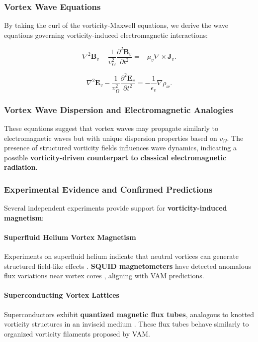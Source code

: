 \documentclass[a4paper,10pt]{article}
\begin{document}
\subsubsection*{Vortex Wave Equations}
By taking the curl of the vorticity-Maxwell equations, we derive the wave equations governing vorticity-induced electromagnetic interactions:

\begin{equation*}
    \nabla^2 \boldsymbol{B}_v - \frac{1}{v_\Omega^2} \frac{\partial^2 \boldsymbol{B}_v}{\partial t^2} = -\mu_v \nabla \times \boldsymbol{J}_v.
\end{equation*}

\begin{equation*}
    \nabla^2 \boldsymbol{E}_v - \frac{1}{v_\Omega^2} \frac{\partial^2 \boldsymbol{E}_v}{\partial t^2} = -\frac{1}{\epsilon_v} \nabla \rho_\text{æ}.
\end{equation*}

\subsubsection*{Vortex Wave Dispersion and Electromagnetic Analogies}
These equations suggest that vortex waves may propagate similarly to electromagnetic waves but with unique dispersion properties based on \( v_\Omega \). The presence of structured vorticity fields influences wave dynamics, indicating a possible \textbf{vorticity-driven counterpart to classical electromagnetic radiation}.

\subsubsection*{Experimental Evidence and Confirmed Predictions}
Several independent experiments provide support for \textbf{vorticity-induced magnetism}:

\paragraph{Superfluid Helium Vortex Magnetism}
Experiments on superfluid helium indicate that neutral vortices can generate structured field-like effects \cite{superfluid_he_interferometers}. \textbf{SQUID magnetometers} have detected anomalous flux variations near vortex cores \cite{initial_vortex_magnetometers}, aligning with VAM predictions.

\paragraph{Superconducting Vortex Lattices}
Superconductors exhibit \textbf{quantized magnetic flux tubes}, analogous to knotted vorticity structures in an inviscid medium \cite{superconducting_flux_focusing}. These flux tubes behave similarly to organized vorticity filaments proposed by VAM.
\end{document}
